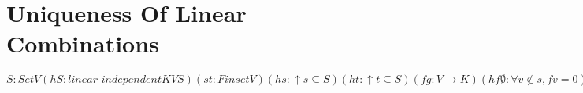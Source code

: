 \section{Uniqueness Of Linear Combinations}

\begin{theorem}
  \label{theorem :  linear_combination_unique}
  \leanok
  ${S : Set V} (hS : linear\_independent K V S) (s t : Finset V) (hs : ↑s \subseteq S) (ht : ↑t \subseteq S) (f g : V \rightarrow K) (hf\emptyset : \forall v \notin s, f v = 0) (hg0 : ∀ v \notin t, g v = 0) (heq : Finset.sum s (fun v \Rightarrow f v \bullet v) = Finset.sum t (fun v \Rightarrow g v \bullet v)) : f = g $
\end{theorem}
